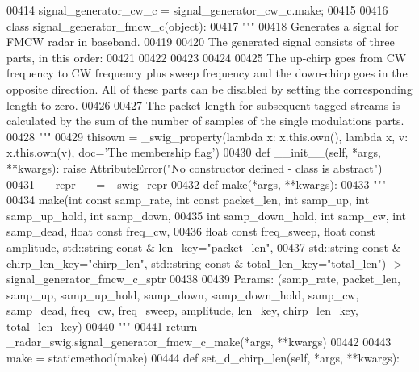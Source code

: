 \begin{DoxyCode}
{{{{00414 signal\_generator\_cw\_c = signal\_generator\_cw\_c.make;
00415 
00416 \textcolor{keyword}{class }signal_generator_fmcw_c(object):
00417     \textcolor{stringliteral}{"""}
00418 \textcolor{stringliteral}{    Generates a signal for FMCW radar in baseband.}
00419 \textcolor{stringliteral}{}
00420 \textcolor{stringliteral}{    The generated signal consists of three parts, in this order:}
00421 \textcolor{stringliteral}{}
00422 \textcolor{stringliteral}{}
00423 \textcolor{stringliteral}{}
00424 \textcolor{stringliteral}{}
00425 \textcolor{stringliteral}{    The up-chirp goes from CW frequency to CW frequency plus sweep frequency and the down-chirp goes in the
       opposite direction. All of these parts can be disabled by setting the corresponding length to zero.}
00426 \textcolor{stringliteral}{}
00427 \textcolor{stringliteral}{    The packet length for subsequent tagged streams is calculated by the sum of the number of samples of
       the single modulations parts.}
00428 \textcolor{stringliteral}{    """}
00429     thisown = _swig_property(\textcolor{keyword}{lambda} x: x.this.own(), \textcolor{keyword}{lambda} x, v: x.this.own(v), doc=\textcolor{stringliteral}{'The membership flag'})
00430     \textcolor{keyword}{def }__init__(self, *args, **kwargs): \textcolor{keywordflow}{raise} AttributeError(\textcolor{stringliteral}{"No constructor defined - class is abstract"})
00431     \_\_repr\_\_ = \_swig\_repr
00432     \textcolor{keyword}{def }make(*args, **kwargs):
00433         \textcolor{stringliteral}{"""}
00434 \textcolor{stringliteral}{        make(int const samp\_rate, int const packet\_len, int samp\_up, int samp\_up\_hold, int samp\_down, }
00435 \textcolor{stringliteral}{            int samp\_down\_hold, int samp\_cw, int samp\_dead, float const freq\_cw, }
00436 \textcolor{stringliteral}{            float const freq\_sweep, float const amplitude, std::string const & len\_key="packet\_len", }
00437 \textcolor{stringliteral}{            std::string const & chirp\_len\_key="chirp\_len", std::string const & total\_len\_key="total\_len")
       -> signal\_generator\_fmcw\_c\_sptr}
00438 \textcolor{stringliteral}{}
00439 \textcolor{stringliteral}{        Params: (samp\_rate, packet\_len, samp\_up, samp\_up\_hold, samp\_down, samp\_down\_hold, samp\_cw,
       samp\_dead, freq\_cw, freq\_sweep, amplitude, len\_key, chirp\_len\_key, total\_len\_key)}
00440 \textcolor{stringliteral}{        """}
00441         \textcolor{keywordflow}{return} \_radar\_swig.signal\_generator\_fmcw\_c\_make(*args, **kwargs)
00442 
00443     make = staticmethod(make)
00444     \textcolor{keyword}{def }set_d_chirp_len(self, *args, **kwargs):
}}}}
\end{DoxyCode}
